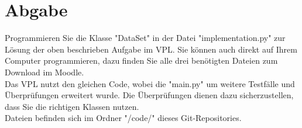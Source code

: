 \documentclass[titlepage]{article}
\begin{document}
\section{Abgabe}
\raggedright
Programmieren Sie die Klasse "DataSet" in der Datei "implementation.py" zur Lösung der oben beschrieben Aufgabe im VPL.
Sie können auch direkt auf Ihrem Computer programmieren, dazu finden Sie alle drei benötigten Dateien zum Download im Moodle.\\

Das VPL nutzt den gleichen Code, wobei die "main.py" um weitere Testfälle und Überprüfungen erweitert wurde.
Die Überprüfungen dienen dazu sicherzustellen, dass Sie die richtigen Klassen nutzen.\\

Dateien befinden sich im Ordner "/code/" dieses Git-Repositories.
\end{document}
